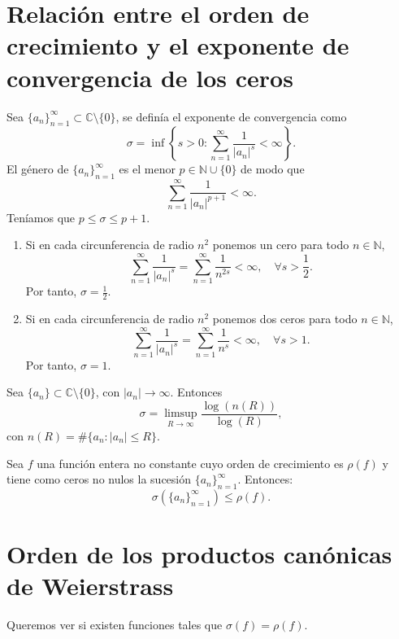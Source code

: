 \section{Relación entre el orden de crecimiento y el exponente de convergencia de los ceros}
Sea $\{a_n\}_{n=1}^\infty \subset \mathbb{C} \setminus \{0\}$, se definía el exponente de convergencia como
$$\sigma = \inf\left\{s > 0 : \sum_{n=1}^\infty \frac{1}{|a_n|^s} < \infty\right\}.$$
El género de $\{a_n\}_{n=1}^\infty$ es el menor $p \in \mathbb{N} \cup \{0\}$ de modo que
$$\sum_{n=1}^\infty \frac{1}{|a_n|^{p+1}} < \infty.$$
Teníamos que $p \leq \sigma \leq p+1$.

\begin{example}
    \hfill
    \begin{enumerate}
        \item Si en cada circunferencia de radio $n^2$ ponemos un cero para todo $n \in \mathbb{N}$,
              $$\sum_{n=1}^\infty \frac{1}{|a_n|^s} = \sum_{n=1}^\infty \frac{1}{n^{2s}} < \infty, \quad \forall s > \frac{1}{2}.$$
              Por tanto, $\sigma = \frac{1}{2}$.

        \item Si en cada circunferencia de radio $n^2$ ponemos dos ceros para todo $n \in \mathbb{N}$,
              $$\sum_{n=1}^\infty \frac{1}{|a_n|^s} = \sum_{n=1}^\infty \frac{1}{n^{s}} < \infty, \quad \forall s > 1.$$
              Por tanto, $\sigma = 1$.
    \end{enumerate}
\end{example}

\begin{lemma}
    Sea $\{a_n\} \subset \mathbb{C} \setminus \{0\}$, con $|a_n| \to \infty$.
    Entonces
    $$\sigma = \limsup_{R \to \infty} \frac{\log(n(R))}{\log(R)},$$
    con $n(R) = \#\{a_n : |a_n| \leq R\}$.
\end{lemma}


\begin{theorem}
    Sea $f$ una función entera no constante cuyo orden de crecimiento es $\rho(f)$ y tiene como ceros no nulos la sucesión $\{a_n\}_{n=1}^\infty$.
    Entonces:
    $$\sigma(\{a_n\}_{n=1}^\infty) \leq \rho(f).$$
\end{theorem}


\section{Orden de los productos canónicas de Weierstrass}
Queremos ver si existen funciones tales que $\sigma(f) = \rho(f)$.


